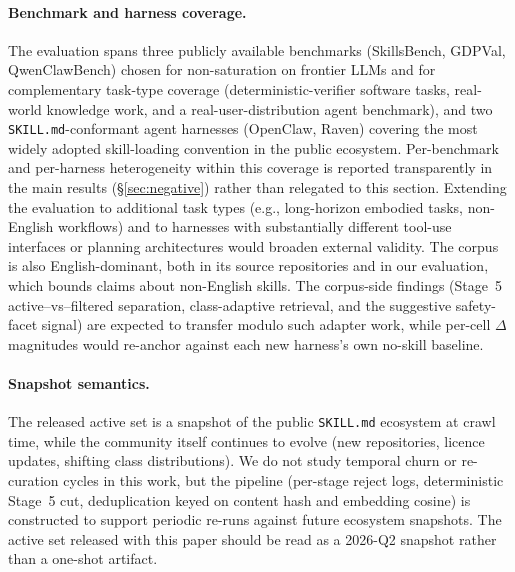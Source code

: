 \paragraph{Benchmark and harness coverage.}
The evaluation spans three publicly available benchmarks
(SkillsBench, GDPVal, QwenClawBench) chosen for
non-saturation on frontier LLMs and for complementary task-type
coverage (deterministic-verifier software tasks, real-world
knowledge work, and a
real-user-distribution agent benchmark), and two
\texttt{SKILL.md}-conformant agent harnesses (OpenClaw, Raven)
covering the most widely adopted skill-loading convention in
the public ecosystem.  Per-benchmark and per-harness
heterogeneity within this coverage is reported transparently
in the main results (\S\ref{sec:negative}) rather than
relegated to this section.
Extending the evaluation to additional task types
(e.g., long-horizon embodied tasks, non-English workflows) and
to harnesses with substantially different tool-use interfaces
or planning architectures would broaden external validity.  The
corpus is also English-dominant, both in its source repositories
and in our evaluation, which bounds claims about non-English
skills.  The
corpus-side findings (Stage~5 active--vs--filtered separation,
class-adaptive retrieval, and the suggestive safety-facet signal)
are expected to transfer modulo such adapter work, while per-cell
$\Delta$ magnitudes would re-anchor against each new harness's
own no-skill baseline.

\paragraph{Snapshot semantics.}
The released active set is a snapshot of the public
\texttt{SKILL.md} ecosystem at crawl time, while the community itself
continues to evolve (new repositories, licence updates, shifting
class distributions).  We do not study temporal churn or
re-curation cycles in this work, but the pipeline (per-stage
reject logs, deterministic Stage~5 cut, deduplication keyed on
content hash and embedding cosine) is constructed to support
periodic re-runs against future ecosystem snapshots.  The active
set released with this paper should be read as a 2026-Q2
snapshot rather than a one-shot artifact.
